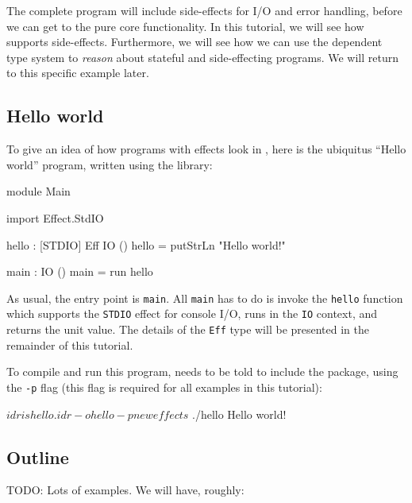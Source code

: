 The complete program will include side-effects for I/O and error handling,
before we can get to the pure core functionality. In this tutorial, we will
see how \Idris{} supports side-effects. Furthermore, we will see how we can 
use the dependent type system to \emph{reason} about stateful and
side-effecting programs. We will return to this specific example later.

\subsection{Hello world}

To give an idea of how programs with effects look in \Idris{}, here is the
ubiquitus ``Hello world'' program, written using the \effects{} library:

\begin{code}
module Main
  
import Effect.StdIO
  
hello : { [STDIO] } Eff IO ()
hello = putStrLn "Hello world!"
  
main : IO ()
main = run hello
\end{code}

\noindent
As usual, the entry point is \texttt{main}. All \texttt{main} has to do is
invoke the \texttt{hello} function which supports the \texttt{STDIO} effect
for console I/O, runs in the \texttt{IO} context, and returns the unit
value. The details of the \texttt{Eff} type will be presented in the
remainder of this tutorial.

To compile and run this program, \Idris{} needs to be told to include the
\effects{} package, using the \texttt{-p} \effects{} flag (this flag
is required for all examples in this tutorial):

\begin{code}
$ idris hello.idr -o hello -p neweffects
$ ./hello
Hello world!
\end{code}

\subsection{Outline}

TODO: Lots of examples. We will have, roughly:

